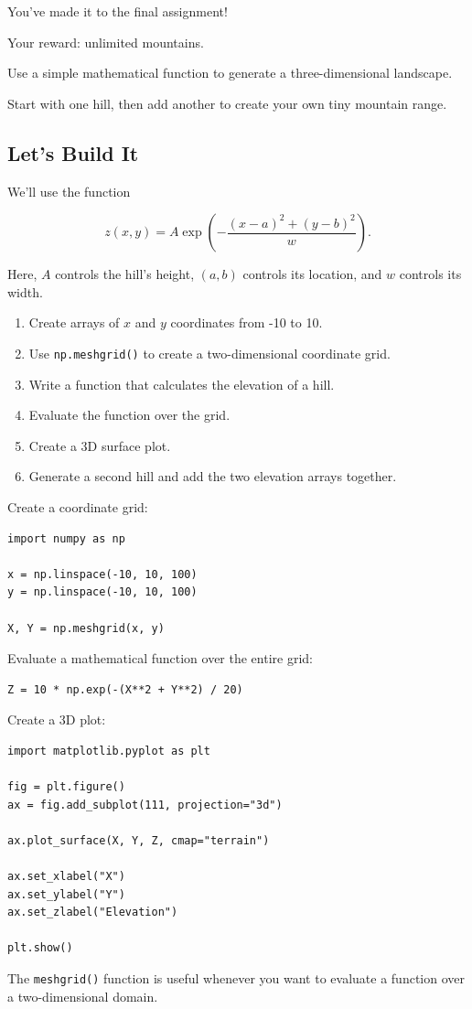\documentclass[11pt,letterpaper]{article}
\newcommand{\steps}{\subsection*{Let's Build It}}
\begin{document}
\begin{missionbox}
You've made it to the final assignment!

Your reward: unlimited mountains.

Use a simple mathematical function
to generate a three-dimensional landscape.

Start with one hill, then add another
to create your own tiny mountain range.
\end{missionbox}

\steps

We'll use the function

\[
z(x,y)=A\exp\left(
-\frac{(x-a)^2+(y-b)^2}{w}
\right).
\]

Here, $A$ controls the hill's height,
$(a,b)$ controls its location,
and $w$ controls its width.

\begin{enumerate}
    \item Create arrays of $x$ and $y$
    coordinates from -10 to 10.
    \item Use \texttt{np.meshgrid()} to
    create a two-dimensional coordinate grid.
    \item Write a function that calculates
    the elevation of a hill.
    \item Evaluate the function over the grid.
    \item Create a 3D surface plot.
    \item Generate a second hill and
    add the two elevation arrays together.
\end{enumerate}

\begin{hintbox}
Create a coordinate grid:

\begin{lstlisting}
import numpy as np

x = np.linspace(-10, 10, 100)
y = np.linspace(-10, 10, 100)

X, Y = np.meshgrid(x, y)
\end{lstlisting}

Evaluate a mathematical function
over the entire grid:

\begin{lstlisting}
Z = 10 * np.exp(-(X**2 + Y**2) / 20)
\end{lstlisting}

Create a 3D plot:

\begin{lstlisting}
import matplotlib.pyplot as plt

fig = plt.figure()
ax = fig.add_subplot(111, projection="3d")

ax.plot_surface(X, Y, Z, cmap="terrain")

ax.set_xlabel("X")
ax.set_ylabel("Y")
ax.set_zlabel("Elevation")

plt.show()
\end{lstlisting}

The \texttt{meshgrid()} function is useful whenever you want to evaluate a function over a two-dimensional domain.
\end{hintbox}
\end{document}
